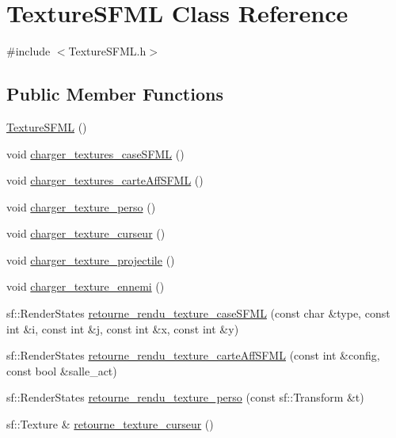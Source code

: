 \hypertarget{classTextureSFML}{}\section{Texture\+S\+F\+ML Class Reference}
\label{classTextureSFML}


{\ttfamily \#include $<$Texture\+S\+F\+M\+L.\+h$>$}

\subsection*{Public Member Functions}
\begin{DoxyCompactItemize}
\item 
\hyperlink{classTextureSFML_af140d180a2ab08c7c8eda5b38f3fb653}{Texture\+S\+F\+ML} ()
\item 
void \hyperlink{classTextureSFML_a0e4fcc15c683b6dc2edb4fdfa04c9b74}{charger\+\_\+textures\+\_\+case\+S\+F\+ML} ()
\item 
void \hyperlink{classTextureSFML_ac9a80a9ca433817596a40c0a250d298d}{charger\+\_\+textures\+\_\+carte\+Aff\+S\+F\+ML} ()
\item 
void \hyperlink{classTextureSFML_af90a280cc0da676e3888edb5e0863911}{charger\+\_\+texture\+\_\+perso} ()
\item 
void \hyperlink{classTextureSFML_a7f5271af1e129ecb4e17ceee400802cc}{charger\+\_\+texture\+\_\+curseur} ()
\item 
void \hyperlink{classTextureSFML_a90b73459f6df531bcce7c2bc11456734}{charger\+\_\+texture\+\_\+projectile} ()
\item 
void \hyperlink{classTextureSFML_ab0c2381533c90bee25963cdb77a3b0f9}{charger\+\_\+texture\+\_\+ennemi} ()
\item 
sf\+::\+Render\+States \hyperlink{classTextureSFML_aa53677d04e938b2aab93706f4e418510}{retourne\+\_\+rendu\+\_\+texture\+\_\+case\+S\+F\+ML} (const char \&type, const int \&i, const int \&j, const int \&x, const int \&y)
\item 
sf\+::\+Render\+States \hyperlink{classTextureSFML_ad7b34fb7ef06ae789c2b608c3d2e73eb}{retourne\+\_\+rendu\+\_\+texture\+\_\+carte\+Aff\+S\+F\+ML} (const int \&config, const bool \&salle\+\_\+act)
\item 
sf\+::\+Render\+States \hyperlink{classTextureSFML_a18df93a994a6343b6aea26d6e397cb1c}{retourne\+\_\+rendu\+\_\+texture\+\_\+perso} (const sf\+::\+Transform \&t)
\item 
sf\+::\+Texture \& \hyperlink{classTextureSFML_ab5c8aa79baa997e736ba3c43babd314e}{retourne\+\_\+texture\+\_\+curseur} ()

\end{DoxyCompactItemize}
